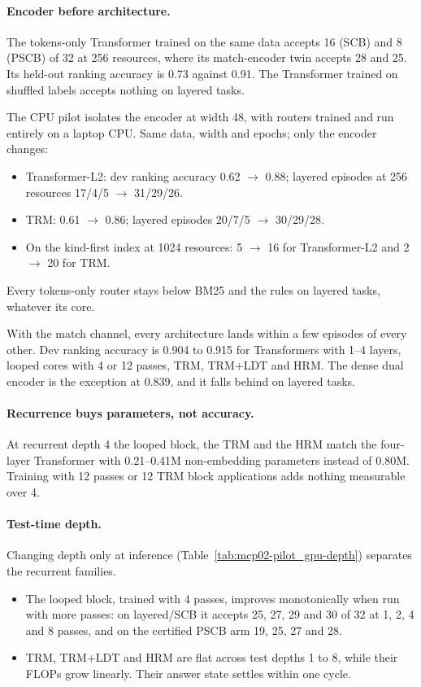 \paragraph{Encoder before architecture.} The tokens-only Transformer trained on the same data accepts 16 (SCB) and
8 (PSCB) of 32 at 256 resources, where its match-encoder twin accepts 28 and 25. Its held-out ranking accuracy is
0.73 against 0.91. The Transformer trained on shuffled labels accepts nothing on layered tasks.

The CPU pilot isolates the encoder at width 48, with routers trained and run entirely on a laptop CPU. Same data,
width and epochs; only the encoder changes:
\begin{itemize}
\item Transformer-L2: dev ranking accuracy 0.62 $\to$ 0.88; layered episodes at 256 resources 17/4/5 $\to$ 31/29/26.
\item TRM: 0.61 $\to$ 0.86; layered episodes 20/7/5 $\to$ 30/29/28.
\item On the kind-first index at 1024 resources: 5 $\to$ 16 for Transformer-L2 and 2 $\to$ 20 for TRM.
\end{itemize}
Every tokens-only router stays below BM25 and the rules on layered tasks, whatever its core.

With the match channel, every architecture lands within a few episodes of every other. Dev ranking accuracy is
0.904 to 0.915 for Transformers with 1--4 layers, looped cores with 4 or 12 passes, TRM, TRM+LDT and HRM. The dense
dual encoder is the exception at 0.839, and it falls behind on layered tasks.

\paragraph{Recurrence buys parameters, not accuracy.} At recurrent depth 4 the looped block, the TRM and the HRM match
the four-layer Transformer with 0.21--0.41M non-embedding parameters instead of 0.80M. Training with 12 passes or
12 TRM block applications adds nothing measurable over 4.

\paragraph{Test-time depth.} Changing depth only at inference (Table~\ref{tab:mcp02-pilot_gpu-depth}) separates the
recurrent families.
\begin{itemize}
\item The looped block, trained with 4 passes, improves monotonically when run with more passes: on layered/SCB it accepts
25, 27, 29 and 30 of 32 at 1, 2, 4 and 8 passes, and on the certified PSCB arm 19, 25, 27 and 28.
\item TRM, TRM+LDT and HRM are flat across test depths 1 to 8, while their FLOPs grow linearly. Their answer state
settles within one cycle.
\end{itemize}

